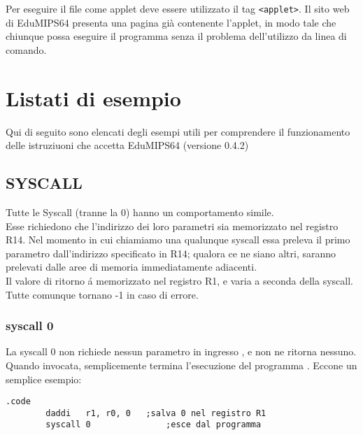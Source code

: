 \documentclass[12pt]{report}
\newcommand{\EM}{EduMIPS64}
\newcommand{\EV}{0.4.2}
\begin{document}
Per eseguire il file come applet deve essere utilizzato il tag \texttt{<applet>}. Il sito web di \EM{}
presenta una pagina gi\`{a} contenente l'applet, in modo tale che chiunque possa eseguire il programma senza il problema dell'utilizzo da linea di comando.

\printindex

\chapter{Listati di esempio}
Qui di seguito sono elencati degli esempi utili per comprendere il funzionamento delle istruziuoni che accetta \EM{} (versione \EV)
\section{SYSCALL}
Tutte le Syscall (tranne la 0) hanno un comportamento simile.\\
Esse  richiedono che l'indirizzo dei loro parametri sia memorizzato nel registro R14. 
Nel momento in cui chiamiamo una qualunque syscall essa preleva il primo parametro dall'indirizzo specificato in R14; qualora ce ne siano altri, 
saranno prelevati dalle aree di memoria immediatamente adiacenti.\\ Il valore di ritorno \'{a} memorizzato nel registro R1, e varia a seconda della syscall. 
Tutte comunque tornano -1 in caso di errore.\\
\newpage
\subsection{syscall 0}
La syscall 0 non richiede nessun parametro in ingresso , e non ne ritorna nessuno. Quando invocata, semplicemente termina l'esecuzione del programma .
Eccone un semplice esempio:

\begin{lstlisting}[caption={syscall0}, label={code:syscall0}, style={mips}]
        .code
        daddi   r1, r0, 0	;salva 0 nel registro R1
        syscall 0				;esce dal programma
\end{lstlisting}
\end{document}

